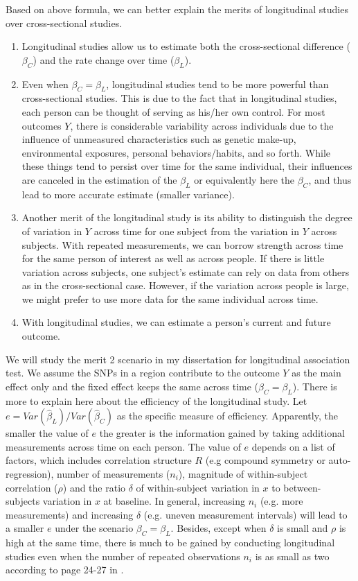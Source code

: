 \documentclass[12pt]{article}
\begin{document}
Based on above formula, we can better explain the merits of longitudinal studies over cross-sectional studies. 
\begin{enumerate}
\item Longitudinal studies allow us to estimate both the cross-sectional difference ($\beta_C$) and the rate change over time ($\beta_L$).
\item Even when $\beta_C = \beta_L$, longitudinal studies tend to be more powerful than cross-sectional studies. This is due to the fact that in longitudinal studies, each person can be thought of serving as his/her own control. For most outcomes $Y$, there is considerable variability across individuals due to the influence of unmeasured characteristics such as genetic make-up, environmental exposures, personal behaviors/habits, and so forth. While these things tend to persist over time for the same individual, their influences are canceled in the estimation of the $\beta_L$ or equivalently here the $\beta_C$, and thus lead to more accurate estimate (smaller variance).
\item Another merit of the longitudinal study is its ability to distinguish the degree of variation in $Y$ across time for one subject from the variation in $Y$ across subjects. With repeated measurements, we can borrow strength across time for the same person of interest as well as across people. If there is little variation across subjects, one subject's estimate can rely on data from others as in the cross-sectional case. However, if the variation across people is large, we might prefer to use more data for the same individual across time.
\item With longitudinal studies, we can estimate a person's current and future outcome. 
\end{enumerate}

We will study the merit 2 scenario in my dissertation for longitudinal association test. We assume the SNPs in a region contribute to the outcome $Y$ as the main effect only and the fixed effect keeps the same across time ($\beta_C = \beta_L$). There is more to explain here about the efficiency of the longitudinal study. Let $e = Var(\hat{\beta}_L) / Var(\hat{\beta}_C)$ as the specific measure of efficiency. Apparently, the smaller the value of $e$ the greater is the information gained by taking additional measurements across time on each person. The value of $e$ depends on a list of factors, which includes correlation structure $R$ (e.g compound symmetry or auto-regression), number of measurements ($n_i$), magnitude of within-subject correlation ($\rho$) and the ratio $\delta$ of within-subject variation in $x$ to between-subjects variation in $x$ at baseline. In general, increasing $n_i$ (e.g. more measurements) and increasing $\delta$ (e.g. uneven measurement intervals) will lead to a smaller $e$ under the scenario $\beta_C = \beta_L$. Besides, except when $\delta$ is small and $\rho$ is high at the same time, there is much to be gained by conducting longitudinal studies even when the number of repeated observations $n_i$ is as small as two according to page 24-27 in \cite{Diggle2002}. 
\end{document}
